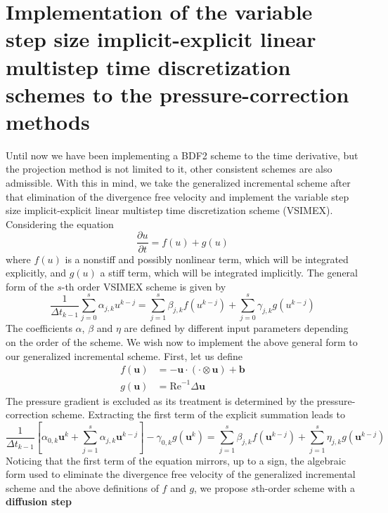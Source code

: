 \documentclass[]{scrartcl}
\newcommand{\pfrac}[2]{\frac{\partial #1}{\partial #2}}
\begin{document}
\section{Implementation of the variable step size implicit-explicit linear multistep time discretization schemes to the pressure-correction methods}
Until now we have been implementing a BDF2 scheme to the time derivative, but the projection method is not limited to it, other consistent schemes are also admissible. With this in mind, we take the generalized incremental scheme after that elimination of the divergence free velocity and implement the variable step size implicit-explicit linear multistep time discretization scheme (VSIMEX). Considering the equation
\begin{equation*}
	\pfrac{u}{t} = f(u) + g(u)
\end{equation*}
where $f(u)$ is a nonstiff and possibly nonlinear term, which will be integrated explicitly, and $g(u)$ a stiff term, which will be integrated implicitly. The general form of the $s$-th order VSIMEX scheme is given by
\begin{equation*}
	\dfrac{1}{\Delta t_{k-1}} \sum_{j=0}^{s} \alpha_{j,k} u^{k-j} = \sum_{j=1}^{s} \beta_{j,k} f(u^{k-j}) + \sum_{j=0}^{s} \gamma_{j,k} g(u^{k-j})
\end{equation*}
The coefficients $\alpha$, $\beta$ and $\eta$ are defined by different input parameters depending on the order of the scheme. We wish now to implement the above general form to our generalized incremental scheme. First, let us define
\begin{equation*}
	\begin{aligned}
		f(\mathbf{u}) &= -\mathbf{u} \cdot (\cdot \otimes \mathbf{u}) + \mathbf{b} \\
		g(\mathbf{u}) &= \textrm{Re}^{-1} \Delta \mathbf{u}
	\end{aligned}
\end{equation*}
The pressure gradient is excluded as its treatment is determined by the pressure-correction scheme. Extracting the first term of the explicit summation leads to
\begin{equation*}
\dfrac{1}{\Delta t_{k-1}} \left[\alpha_{0,k} \mathbf{u}^{k} + \sum_{j=1}^{s} \alpha_{j,k} \mathbf{u}^{k-j}\right] - \gamma_{0,k} g(\mathbf{u}^{k}) = \sum_{j=1}^{s} \beta_{j,k} f(\mathbf{u}^{k-j}) + \sum_{j=1}^{s} \eta_{j,k} g(\mathbf{u}^{k-j})
\end{equation*}
Noticing that the first term of the equation mirrors, up to a sign, the algebraic form used to eliminate the divergence free velocity of the generalized incremental scheme and the above definitions of $f$ and $g$, we propose $s$th-order scheme with a \textbf{diffusion step}
\end{document}
